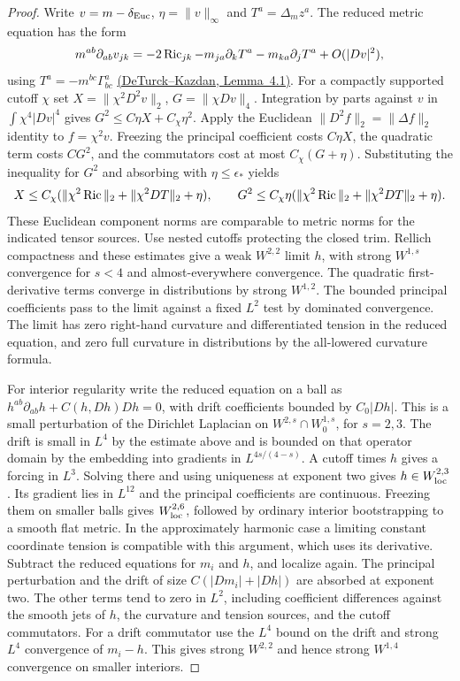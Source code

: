 \begin{proof}
Write \(v=m-\delta_{\rm Euc}\), \(\eta=\|v\|_\infty\) and
\(T^a=\Delta_m z^a\). The reduced metric equation has the form
\[
 m^{ab}\partial_{ab}v_{jk}
 =-2\operatorname{Ric}_{jk}-m_{ja}\partial_kT^a-m_{ka}\partial_jT^a
   +O(|Dv|^2),
\]
using \(T^a=-m^{bc}\Gamma^a_{bc}\)
\href{https://www.numdam.org/item/10.24033/asens.1405.pdf}{(DeTurck--Kazdan,
Lemma~4.1)}. For a compactly supported cutoff \(\chi\) set
\(X=\|\chi^2D^2v\|_2\), \(G=\|\chi Dv\|_4\). Integration by
parts against \(v\) in \(\int \chi^4|Dv|^4\) gives
\(G^2\le C\eta X+C_\chi\eta^2\). Apply the Euclidean
\(\|D^2f\|_2=\|\Delta f\|_2\) identity to \(f=\chi^2v\).
Freezing the principal coefficient costs \(C\eta X\), the
quadratic term costs \(CG^2\), and the commutators cost at most
\(C_\chi(G+\eta)\). Substituting the inequality for \(G^2\)
and absorbing with \(\eta\le\epsilon_*\) yields
\[
 X\le C_\chi(\|\chi^2\operatorname{Ric}\|_2+\|\chi^2 DT\|_2+\eta),\qquad
 G^2\le C_\chi\eta(\|\chi^2\operatorname{Ric}\|_2+\|\chi^2 DT\|_2+\eta).
\]
These Euclidean component norms are comparable to metric norms
for the indicated tensor sources. Use nested cutoffs protecting
the closed trim. Rellich compactness and these estimates give a
weak \(W^{2,2}\) limit \(h\), with strong \(W^{1,s}\) convergence
for \(s<4\) and almost-everywhere convergence. The quadratic
first-derivative terms converge in distributions by strong
\(W^{1,2}\). The bounded principal coefficients pass to the
limit against a fixed \(L^2\) test by dominated convergence.
The limit has zero right-hand curvature and differentiated
tension in the reduced equation, and zero full curvature in
distributions by the all-lowered curvature formula.

For interior regularity write the reduced equation on a ball as
\(h^{ab}\partial_{ab}h+C(h,Dh)Dh=0\), with drift coefficients
bounded by \(C_0|Dh|\). This is a small perturbation of the
Dirichlet Laplacian on \(W^{2,s}\cap W^{1,s}_0\), for \(s=2,3\).
The drift is small in \(L^4\) by the estimate above and is bounded
on that operator domain by the embedding into gradients in
\(L^{4s/(4-s)}\). A cutoff times \(h\) gives a forcing in
\(L^3\). Solving there and using uniqueness at exponent two
gives \(h\in W^{2,3}_{\rm loc}\). Its gradient lies in \(L^{12}\)
and the principal coefficients are continuous. Freezing them on
smaller balls gives \(W^{2,6}_{\rm loc}\), followed by ordinary
interior bootstrapping to a smooth flat metric. In the
approximately harmonic case a limiting constant coordinate
tension is compatible with this argument, which uses its derivative.
Subtract the reduced equations for \(m_i\) and \(h\), and localize
again. The principal perturbation and the drift of size
\(C(|Dm_i|+|Dh|)\) are absorbed at exponent two. The other terms
tend to zero in \(L^2\), including coefficient differences against
the smooth jets of \(h\), the curvature and tension sources, and
the cutoff commutators. For a drift commutator use the \(L^4\)
bound on the drift and strong \(L^4\) convergence of \(m_i-h\).
This gives strong \(W^{2,2}\) and hence strong \(W^{1,4}\)
convergence on smaller interiors.


\end{proof}

